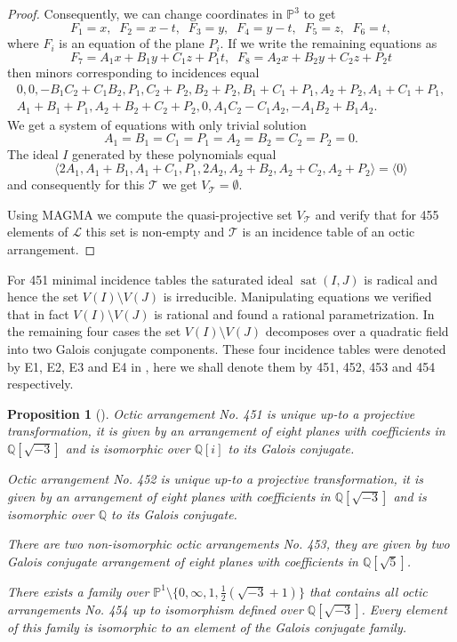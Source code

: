 \documentclass[12pt]{amsart}
\theoremstyle{plain}
\newtheorem{prop}[theorem]{Proposition}
\theoremstyle{remark}
\theoremstyle{definition}
\newcommand{\PP}{\mathbb P}
\newcommand\QQ{{\mathbb Q}}
\numberwithin{table}{section}
\begin{document}
\begin{proof}
	Consequently, we can change  coordinates in $\PP^{3}$ to get
	\[F_{1}=x,\;\; F_{2}=x-t,\;\; F_{3}=y,\;\; F_{4}=y-t,\;\; F_{5}=z,\;\;
	F_{6}=t,\]
	where $F_{i}$ is an equation of the plane $P_{i}$. If we write the
	remaining equations as
	\[F_{7}=A_{1}x+B_{1}y+C_{1}z+P_{1}t,\;\;
	F_{8}=A_{2}x+B_{2}y+C_{2}z+P_{2}t\]
	then minors corresponding to incidences equal
	\begin{eqnarray*}
	 0, 0, -B_{1}C_{2} + C_{1}B_{2}, P_{1}, C_{2} + P_{2}, B_{2} + P_{2}, B_{1} + C_{1} + P_{1}, A_{2} + P_{2}, A_{1} + C_{1} + P_{1}, \\
	 A_{1} + B_{1} + P_{1}, A_{2} + B_{2} + C_{2} + P_{2}, 0, A_{1}C_{2} - C_{1}A_{2}, -A_{1}B_{2} + B_{1}A_{2}.
	\end{eqnarray*}
	We get a system of equations with only trivial solution
	\[A_{1}=B_{1}=C_{1}=P_{1}=A_{2}=B_{2}=C_{2}=P_{2}=0.\]
The ideal $I$ generated by these polynomials
equal
\[\langle2A_{1},A_{1}+B_{1},A_{1}+C_{1},P_{1},2A_{2},A_{2}+B_{2},A_{2}+C_{2},A_{2}+P_{2}\rangle = \langle0\rangle\]
and consequently for this $\mathcal T$ we get $V_{\mathcal T}=\emptyset$.

Using MAGMA we compute the quasi-projective set $V_{\mathcal T}$ and verify that for 455 elements of $\mathcal L$ this set is non-empty and $\mathcal T$ is an incidence table of an octic arrangement.

\end{proof}
For 451 minimal incidence tables the saturated ideal $\operatorname{sat}(I,J)$
is radical and hence the set $V(I)\setminus V(J)$ is
irreducible. Manipulating equations we verified that in fact
$V(I)\setminus V(J)$ is rational and found a rational
parametrization. In the remaining four cases the set $V(I)\setminus
V(J)$ decomposes over a quadratic field into two Galois conjugate
components. These four incidence tables were denoted by E1, E2, E3 and E4
in \cite{CK-C}, here we shall denote them by 451, 452, 453 and 454
respectively.

\begin{prop}[\mbox{\cite[Thm.~7.3]{CK-C}}]
	Octic arrangement No. 451 is unique up-to a projective
	transformation, it is given by an arrangement of eight planes with
	coefficients in $\QQ[\sqrt{-3}]$ and is isomorphic over $\QQ[i]$ to
	its Galois conjugate.

	Octic arrangement No. 452 is unique up-to a projective
	transformation, it is given by an arrangement of eight planes with
	coefficients in $\QQ[\sqrt{-3}]$ and is isomorphic over $\QQ$ to
	its Galois conjugate.

	There are two non-isomorphic octic arrangements No. 453, they are
	given by two Galois conjugate arrangement of eight planes with
	coefficients in $\QQ[\sqrt{5}]$.

	There exists a family  over $\PP^{1}\setminus\{0, \infty, 1,
	\frac12(\sqrt{-3}+1)\}$ that contains all octic arrangements No. 454
	up to isomorphism defined over $\QQ[\sqrt{-3}]$. Every element of this
	family is isomorphic to an element of the Galois conjugate family.
\end{prop}
\end{document}

